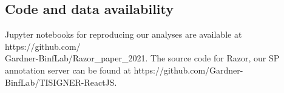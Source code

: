 \subsection{Code and data availability}
Jupyter notebooks for reproducing our analyses are available at
https://github.com/\\Gardner-BinfLab/Razor\_paper\_2021. The source code for Razor, our SP annotation server can be found at https://github.com/Gardner-BinfLab/TISIGNER-ReactJS.




